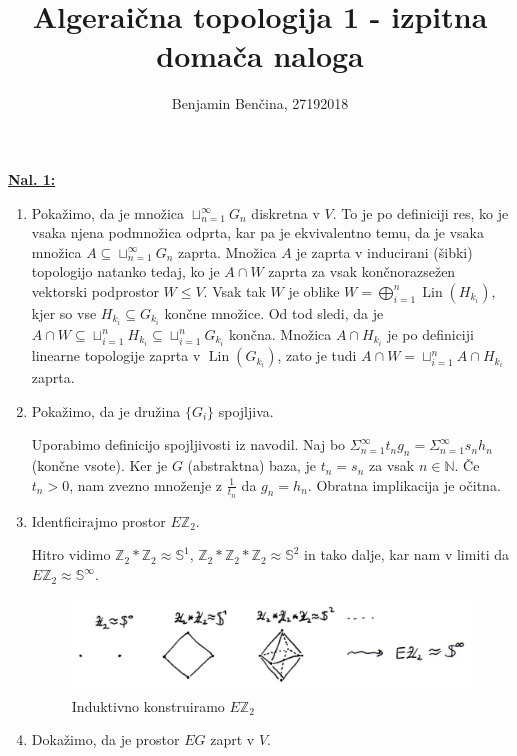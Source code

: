 \documentclass[a4paper, 12pt]{article}
\title{Algeraična topologija 1 - izpitna domača naloga}
\author{Benjamin Benčina, 27192018}
\DeclareMathOperator{\Lin}{Lin}
\renewcommand{\S}{\mathbb{S}}
\newcommand{\N}{\mathbb{N}}
\newcommand{\Z}{\mathbb{Z}}
\newcommand{\homeo}{\approx}
\begin{document}
\maketitle

\underline{\textbf{Nal. 1:}}
\begin{enumerate}[label=(\alph*)]
	\item Pokažimo, da je množica $\sqcup_{n=1}^\infty G_n$ diskretna v $V$. To je po definiciji res, ko je vsaka njena podmnožica odprta, kar pa je ekvivalentno temu, da je vsaka množica $A \subseteq \sqcup_{n=1}^\infty G_n$ zaprta. Množica $A$ je zaprta v inducirani (šibki) topologijo natanko tedaj, ko je $A \cap W$ zaprta za vsak končnorazsežen vektorski podprostor $W \leq V$. Vsak tak $W$ je oblike $W = \bigoplus_{i = 1}^n \Lin(H_{k_i})$, kjer so vse $H_{k_i} \subseteq G_{k_i}$ končne množice. Od tod sledi, da je $A \cap W \subseteq \sqcup_{i=1}^n H_{k_i} \subseteq \sqcup_{i=1}^n G_{k_i}$ končna. Množica $A \cap H_{k_i}$ je po definiciji linearne topologije zaprta v $\Lin(G_{k_i})$, zato je tudi $A \cap W = \sqcup_{i=1}^n A \cap H_{k_i}$ zaprta.
	
	\item Pokažimo, da je družina $\lbrace G_i \rbrace$ spojljiva.
	
	Uporabimo definicijo spojljivosti iz navodil. Naj bo $\Sigma_{n = 1}^\infty t_n g_n = \Sigma_{n = 1}^\infty s_n h_n$ (končne vsote). Ker je $G$ (abstraktna) baza, je $t_n = s_n$ za vsak $n \in \N$. Če $t_n > 0$, nam zvezno množenje z $\frac{1}{t_n}$ da $g_n = h_n$. Obratna implikacija je očitna.
	
	\item Identficirajmo prostor $E\Z_2$.
	
	Hitro vidimo $\Z_2 * \Z_2 \homeo \S^1$, $\Z_2 * \Z_2 * \Z_2 \homeo \S^2$ in tako dalje, kar nam v limiti da $E\Z_2 \homeo \S^\infty$.
	
	\begin{figure}[h]
		\centering
		\includegraphics[scale=0.3]{EZ1c.png}
		\caption{Induktivno konstruiramo $E\Z_2$}
		\label{fig:EZ2}
	\end{figure}
	
	\item Dokažimo, da je prostor $EG$ zaprt v $V$.
	

\end{enumerate}
\end{document}
